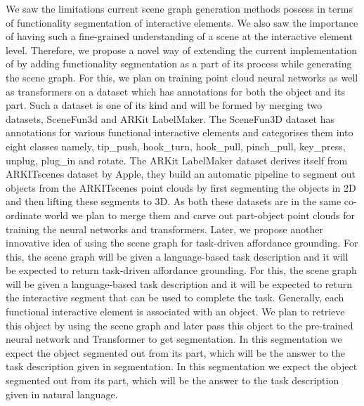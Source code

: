 We saw the limitations current scene graph generation methods possess in terms of functionality segmentation of interactive elements. We also
saw the importance of having such a fine-grained understanding of a scene at the interactive element level. Therefore, we propose a novel way of
extending the current implementation of \cite{gu2023conceptgraphsopenvocabulary3dscene} by adding functionality segmentation as a part of its process while generating the 
scene graph. For this, we plan on training point cloud neural networks as well as transformers on a dataset which has annotations for both the
object and its part. Such a dataset is one of its kind and will be formed by merging two datasets, SceneFun3d and ARKit LabelMaker.
The SceneFun3D dataset has annotations for various functional interactive elements and categorises them into eight classes namely,
tip\_push, hook\_turn, hook\_pull, pinch\_pull, key\_press, unplug, plug\_in and rotate. The ARKit LabelMaker dataset derives itself from ARKITscenes dataset
by Apple, they build an automatic pipeline to segment out objects from the ARKITscenes point clouds by first segmenting the objects in 2D and 
then lifting these segments to 3D. As both these datasets are in the same co-ordinate world we plan to merge them and carve out part-object
point clouds for training the neural networks and transformers. Later, we propose another innovative idea of using the scene graph for 
task-driven affordance grounding. For this, the scene graph will be given a language-based task description and it will be expected to return
task-driven affordance grounding. For this, the scene graph will be given a language-based task description and it will be expected to return
the interactive segment that can be used to complete the task. Generally, each functional interactive element is associated with an object.
We plan to retrieve this object by using the scene graph and later pass this object to the pre-trained neural network and Transformer to get
segmentation. In this segmentation we expect the object segmented out from its part, which will be the answer to the task description given in 
segmentation. In this segmentation we expect the object segmented out from its part, which will be the answer to the task description given in 
natural language.